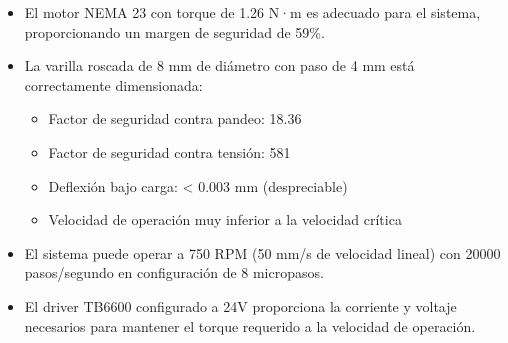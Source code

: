 \begin{itemize}
    \item El motor NEMA 23 con torque de 1.26 N·m es adecuado para el sistema, proporcionando un margen de seguridad de 59\%.
    \item La varilla roscada de 8 mm de diámetro con paso de 4 mm está correctamente dimensionada:
    \begin{itemize}
        \item Factor de seguridad contra pandeo: 18.36
        \item Factor de seguridad contra tensión: 581
        \item Deflexión bajo carga: < 0.003 mm (despreciable)
        \item Velocidad de operación muy inferior a la velocidad crítica
    \end{itemize}
    \item El sistema puede operar a 750 RPM (50 mm/s de velocidad lineal) con 20000 pasos/segundo en configuración de 8 micropasos.
    \item El driver TB6600 configurado a 24V proporciona la corriente y voltaje necesarios para mantener el torque requerido a la velocidad de operación.
\end{itemize}